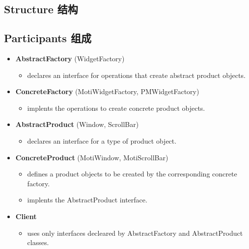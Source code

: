 \subsection{Structure 结构}


\subsection{Participants 组成}

\begin{itemize}
\small
\item \textbf{AbstractFactory} (WidgetFactory)

	\begin{itemize}
		\item declares an interface for operations that create abstract product objects.
	\end{itemize}

\item \textbf{ConcreteFactory} (MotiWidgetFactory, PMWidgetFactory)
	
	\begin{itemize}
		\item  implents the operations to create concrete product objects.
	\end{itemize}

\item \textbf{AbstractProduct} (Window, ScrollBar)

	\begin{itemize}
		\item declares an interface for a type of product object.
	\end{itemize}

\item \textbf{ConcreteProduct} (MotiWindow, MotiScrollBar)

	\begin{itemize}
		\item defines a product objects to be created by the corresponding concrete factory.

		\item implents the AbstractProduct interface.
	\end{itemize}

\item \textbf{Client} 

	\begin{itemize}
		\item  uses only interfaces decleared by AbstractFactory and AbstractProduct classes.
	\end{itemize}
\normalize
\end{itemize}

